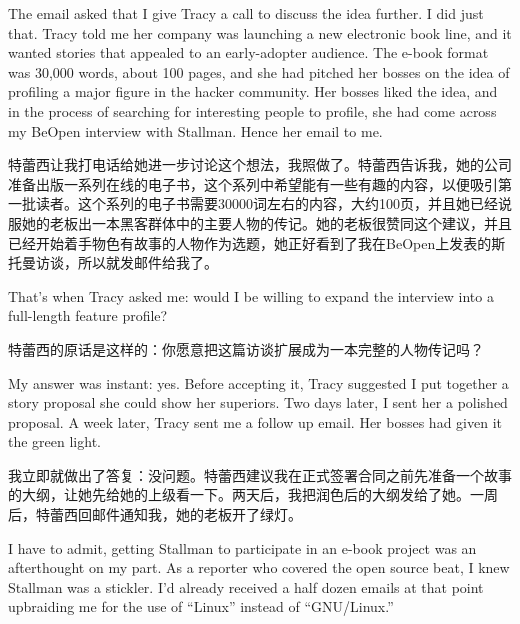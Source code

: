 \ifdefined\eng
The email asked that I give Tracy a call to discuss the idea further. I did just that. Tracy told me her company was launching a new electronic book line, and it wanted stories that appealed to an early-adopter audience. The e-book format was 30,000 words, about 100 pages, and she had pitched her bosses on the idea of profiling a major figure in the hacker community. Her bosses liked the idea, and in the process of searching for interesting people to profile, she had come across my BeOpen interview with Stallman. Hence her email to me.
\fi

\ifdefined\chs
特蕾西让我打电话给她进一步讨论这个想法，我照做了。特蕾西告诉我，她的公司准备出版一系列在线的电子书，这个系列中希望能有一些有趣的内容，以便吸引第一批读者。这个系列的电子书需要30000词左右的内容，大约100页，并且她已经说服她的老板出一本黑客群体中的主要人物的传记。她的老板很赞同这个建议，并且已经开始着手物色有故事的人物作为选题，她正好看到了我在BeOpen上发表的斯托曼访谈，所以就发邮件给我了。
\fi

\ifdefined\eng
That's when Tracy asked me: would I be willing to expand the interview into a full-length feature profile?
\fi

\ifdefined\chs
特蕾西的原话是这样的：你愿意把这篇访谈扩展成为一本完整的人物传记吗？
\fi

\ifdefined\eng
My answer was instant: yes. Before accepting it, Tracy suggested I put together a story proposal she could show her superiors. Two days later, I sent her a polished proposal. A week later, Tracy sent me a follow up email. Her bosses had given it the green light.
\fi

\ifdefined\chs
我立即就做出了答复：没问题。特蕾西建议我在正式签署合同之前先准备一个故事的大纲，让她先给她的上级看一下。两天后，我把润色后的大纲发给了她。一周后，特蕾西回邮件通知我，她的老板开了绿灯。
\fi

\ifdefined\eng
I have to admit, getting Stallman to participate in an e-book project was an afterthought on my part. As a reporter who covered the open source beat, I knew Stallman was a stickler. I'd already received a half dozen emails at that point upbraiding me for the use of ``Linux'' instead of ``GNU/Linux.''
\fi

